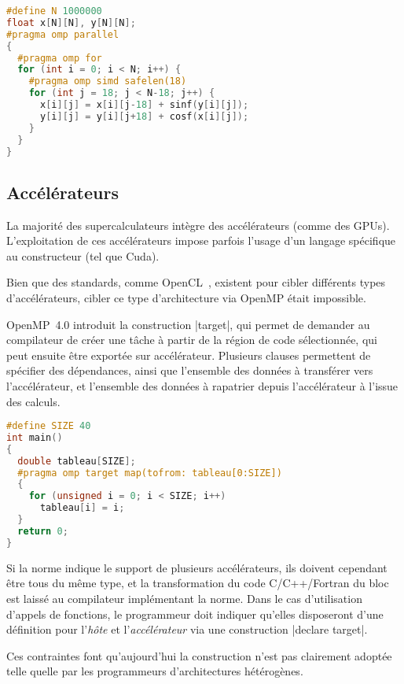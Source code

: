 \begin{lstlisting}[language=c++,caption=Vectorisation d'une opération complexes sur des tableaux,label=lst:context:openmp:simd]
#define N 1000000
float x[N][N], y[N][N];
#pragma omp parallel
{
  #pragma omp for
  for (int i = 0; i < N; i++) {
    #pragma omp simd safelen(18)
    for (int j = 18; j < N-18; j++) {
      x[i][j] = x[i][j-18] + sinf(y[i][j]);
      y[i][j] = y[i][j+18] + cosf(x[i][j]);
    }
  }
}
\end{lstlisting}



\subsection{Accélérateurs}

La majorité des supercalculateurs intègre des accélérateurs (comme des GPUs).
L'exploitation de ces accélérateurs impose parfois l'usage d'un langage spécifique au constructeur (tel que Cuda).

Bien que des standards, comme OpenCL~\cite{Stone2010}, existent pour cibler différents types d'accélérateurs, cibler ce type d'architecture via OpenMP était impossible.

OpenMP~4.0 introduit la construction |target|, qui permet de demander au compilateur de créer une tâche à partir de la région de code sélectionnée, qui peut ensuite être exportée sur accélérateur.
Plusieurs clauses permettent de spécifier des dépendances, ainsi que l'ensemble des données à transférer vers l'accélérateur, et l'ensemble des données à rapatrier depuis l'accélérateur à l'issue des calculs.

\begin{lstlisting}[language=c++,caption=Addition sur un accélérateur,label=lst:context:openmp:target]
#define SIZE 40
int main()
{
  double tableau[SIZE];
  #pragma omp target map(tofrom: tableau[0:SIZE])
  {
    for (unsigned i = 0; i < SIZE; i++)
      tableau[i] = i;
  }
  return 0;
}
\end{lstlisting}


Si la norme indique le support de plusieurs accélérateurs, ils doivent cependant être tous du même type, et la transformation du code C/C++/Fortran du bloc est laissé au compilateur implémentant la norme.
Dans le cas d'utilisation d'appels de fonctions, le programmeur doit indiquer qu'elles disposeront d'une définition pour l'\emph{hôte} et l'\emph{accélérateur} via une construction |declare target|.

Ces contraintes font qu'aujourd'hui la construction n'est pas clairement adoptée telle quelle par les programmeurs d'architectures hétérogènes.

